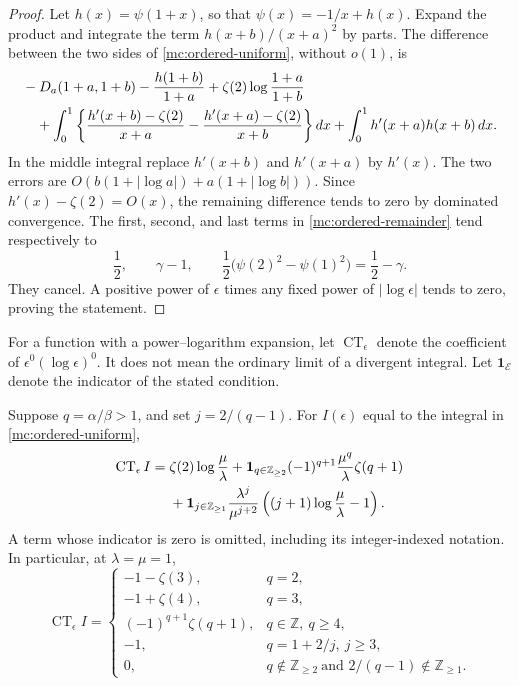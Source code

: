 \begin{proof}
Let $h(x)=\psi(1+x)$, so that $\psi(x)=-1/x+h(x)$.
Expand the product and integrate the term
$h(x+b)/(x+a)^2$ by parts. The difference between the two sides of
\eqref{mc:ordered-uniform}, without $o(1)$, is
\begin{align}\label{mc:ordered-remainder}
 &-D_a(1+a,1+b)-\frac{h(1+b)}{1+a}
     +\zeta(2)\log\frac{1+a}{1+b}\notag\\
 &\quad+\int_0^1\left\{
       \frac{h'(x+b)-\zeta(2)}{x+a}
      -\frac{h'(x+a)-\zeta(2)}{x+b}\right\}dx
      +\int_0^1h'(x+a)h(x+b)\,dx.
\end{align}
In the middle integral replace $h'(x+b)$ and $h'(x+a)$ by
$h'(x)$. The two errors are
$O(b(1+|\log a|)+a(1+|\log b|))$.
Since $h'(x)-\zeta(2)=O(x)$, the remaining difference tends to
zero by dominated convergence. The first, second, and last terms
in \eqref{mc:ordered-remainder} tend respectively to
\[
 \frac12,\qquad \gamma-1,\qquad
 \frac12\bigl(\psi(2)^2-\psi(1)^2\bigr)=\frac12-\gamma.
\]
They cancel. A positive power of $\epsilon$ times any fixed power
of $|\log\epsilon|$ tends to zero, proving the statement.
\end{proof}

For a function with a power--logarithm expansion, let
$\operatorname{CT}_{\epsilon}$ denote the coefficient of
$\epsilon^0(\log\epsilon)^0$. It does not mean the ordinary limit
of a divergent integral. Let $\mathbf1_{\mathcal E}$ denote the
indicator of the stated condition.

\begin{corollary}\label{mc:ordered-CT}
Suppose $q=\alpha/\beta>1$, and set $j=2/(q-1)$.
For $I(\epsilon)$ equal to the integral in
\eqref{mc:ordered-uniform},
\begin{align}\label{mc:ordered-constant}
 \operatorname{CT}_{\epsilon}I
 ={}&\zeta(2)\log\frac\mu\lambda
  +\mathbf1_{q\in\mathbb Z_{\ge2}}
       (-1)^{q+1}\frac{\mu^q}{\lambda}\zeta(q+1)\notag\\
 &+\mathbf1_{j\in\mathbb Z_{\ge1}}
       \frac{\lambda^j}{\mu^{j+2}}
                  \left((j+1)\log\frac\mu\lambda-1\right).
\end{align}
A term whose indicator is zero is omitted, including its
integer-indexed notation. In particular, at $\lambda=\mu=1$,
\begin{equation}\label{mc:ordered-examples}
 \operatorname{CT}_{\epsilon}I=
 \begin{cases}
  -1-\zeta(3),&q=2,\\
  -1+\zeta(4),&q=3,\\
  (-1)^{q+1}\zeta(q+1),&q\in\mathbb Z,\ q\ge4,\\
  -1,&q=1+2/j,\ j\ge3,\\
  0,&q\notin\mathbb Z_{\ge2}\ \text{and }2/(q-1)\notin\mathbb Z_{\ge1}.
 \end{cases}
\end{equation}
\end{corollary}


